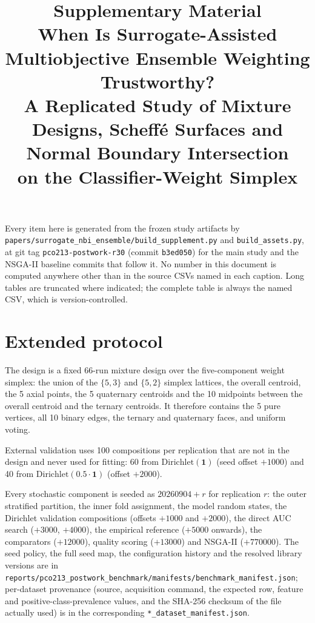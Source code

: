 \documentclass[11pt,a4paper]{article}
\title{\bfseries Supplementary Material\\[0.4em]
\large When Is Surrogate-Assisted Multiobjective Ensemble Weighting Trustworthy?\\
A Replicated Study of Mixture Designs, Scheff\'e Surfaces and Normal Boundary Intersection\\
on the Classifier-Weight Simplex}
\author{\ifanon{}{Caio Tertuliano Ribeiro \quad Matheus Costa Pereira \quad Anderson Paulo de Paiva}}
\date{}
\begin{document}
\maketitle

\noindent
Every item here is generated from the frozen study artifacts by
\texttt{papers/\allowbreak surrogate\_nbi\_ensemble/\allowbreak build\_supplement.py} and
\texttt{build\_assets.py}, at git tag \texttt{pco213-postwork-r30} (commit \texttt{b3ed050}) for the main study and the
NSGA-II baseline commits that follow it. No number in this document is computed anywhere other than in the source
CSVs named in each caption. Long tables are truncated where indicated; the complete table is always the named CSV,
which is version-controlled.

\tableofcontents
\newpage

\section{Extended protocol}
\label{sec:s1}

The design is a fixed 66-run mixture design over the five-component weight simplex: the union of the $\{5,3\}$ and
$\{5,2\}$ simplex lattices, the overall centroid, the 5 axial points, the 5 quaternary centroids and the 10 midpoints
between the overall centroid and the ternary centroids. It therefore contains the 5 pure vertices, all 10 binary
edges, the ternary and quaternary faces, and uniform voting.

External validation uses 100 compositions per replication that are not in the design and never used for fitting:
60 from $\mathrm{Dirichlet}(\mathbf{1})$ (seed offset $+1000$) and 40 from $\mathrm{Dirichlet}(0.5\cdot\mathbf{1})$
(offset $+2000$).

Every stochastic component is seeded as $20260904 + r$ for replication $r$: the outer stratified partition, the
inner fold assignment, the model random states, the Dirichlet validation compositions (offsets $+1000$ and $+2000$),
the direct AUC search ($+3000$, $+4000$), the empirical reference ($+5000$ onwards), the comparators ($+12000$),
quality scoring ($+13000$) and NSGA-II ($+770000$). The seed policy, the full seed map, the configuration history and the resolved library
versions are in \texttt{reports/\allowbreak pco213\_postwork\_benchmark/\allowbreak manifests/\allowbreak benchmark\_manifest.json}; per-dataset
provenance (source, acquisition command, the expected row, feature and positive-class-prevalence values, and the
SHA-256 checksum of the file actually used) is in the corresponding
\texttt{*\_dataset\_manifest.json}.
\end{document}
